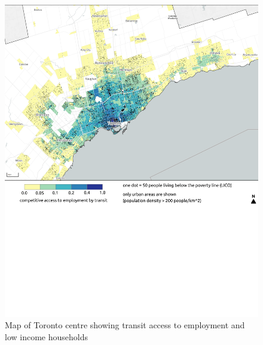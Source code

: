 \documentclass[11 pt, letterpaper]{article}
\begin{document}
{\begin{figure}[H]
	\caption{Map of Toronto centre showing transit access to employment and low income households} 
	\label{a_van}
	\centerline{\includegraphics[width=6.5in]{figures/appendix_maps/a_tor_centre.png}}
	\vspace{2mm}
\end{figure}

}
\end{document}
